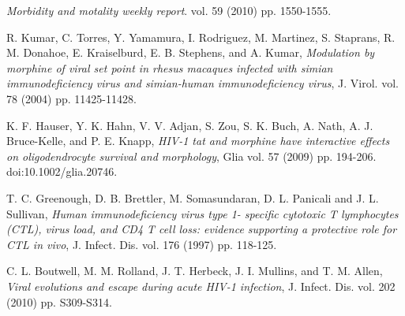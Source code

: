 \documentclass[11pt, oneside]{article}    %
\begin{document}
\begin{thebibliography}{99}
\itemsep 0pt\relax

{\em Morbidity and motality weekly report}. vol. 59 (2010) pp. 1550-1555.

R. Kumar, C. Torres, Y. Yamamura, I. Rodriguez, M. Martinez, S. Staprans, R. M. Donahoe, E. Kraiselburd, E. B. Stephens, and A. Kumar,  {\em Modulation by morphine of viral set point in rhesus macaques infected with simian immunodeficiency virus and simian-human immunodeficiency virus}, J. Virol. vol. 78 (2004) pp. 11425-11428.

K. F. Hauser, Y. K. Hahn, V. V. Adjan, S. Zou, S. K. Buch, A. Nath, A. J. Bruce-Kelle, and P. E. Knapp, {\em HIV-1 tat and morphine have interactive effects on oligodendrocyte survival and morphology},  Glia vol.  57 (2009) pp. 194-206. doi:10.1002/glia.20746.

T. C. Greenough, D. B. Brettler, M. Somasundaran, D. L. Panicali and J. L. Sullivan,  {\em Human immunodeficiency virus type 1- specific cytotoxic T lymphocytes (CTL), virus load, and CD4 T cell loss: evidence supporting a protective role for CTL in vivo}, J. Infect. Dis. vol. 176 (1997) pp. 118-125.

C. L. Boutwell, M. M. Rolland, J. T. Herbeck, J. I. Mullins, and T. M. Allen,  {\em Viral evolutions and escape during acute HIV-1 infection}, J. Infect. Dis. vol. 202 (2010) pp. S309-S314.


\end{thebibliography}
\end{document}
